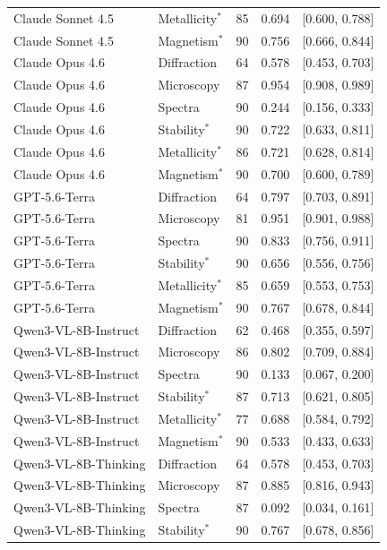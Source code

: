 \documentclass[11pt,a4paper]{article}
\begin{document}
\begin{table}[htbp]
{\begin{tabular}{l l S[table-format=3.0] S[table-format=1.3] c}
Claude Sonnet 4.5 & Metallicity$^{*}$ & 85 & 0.694 & [0.600, 0.788] \\
Claude Sonnet 4.5 & Magnetism$^{*}$ & 90 & 0.756 & [0.666, 0.844] \\
\addlinespace
Claude Opus 4.6 & Diffraction & 64 & 0.578 & [0.453, 0.703] \\
Claude Opus 4.6 & Microscopy & 87 & 0.954 & [0.908, 0.989] \\
Claude Opus 4.6 & Spectra & 90 & 0.244 & [0.156, 0.333] \\
Claude Opus 4.6 & Stability$^{*}$ & 90 & 0.722 & [0.633, 0.811] \\
Claude Opus 4.6 & Metallicity$^{*}$ & 86 & 0.721 & [0.628, 0.814] \\
Claude Opus 4.6 & Magnetism$^{*}$ & 90 & 0.700 & [0.600, 0.789] \\
\addlinespace
GPT-5.6-Terra & Diffraction & 64 & 0.797 & [0.703, 0.891] \\
GPT-5.6-Terra & Microscopy & 81 & 0.951 & [0.901, 0.988] \\
GPT-5.6-Terra & Spectra & 90 & 0.833 & [0.756, 0.911] \\
GPT-5.6-Terra & Stability$^{*}$ & 90 & 0.656 & [0.556, 0.756] \\
GPT-5.6-Terra & Metallicity$^{*}$ & 85 & 0.659 & [0.553, 0.753] \\
GPT-5.6-Terra & Magnetism$^{*}$ & 90 & 0.767 & [0.678, 0.844] \\
\addlinespace
Qwen3-VL-8B-Instruct & Diffraction & 62 & 0.468 & [0.355, 0.597] \\
Qwen3-VL-8B-Instruct & Microscopy & 86 & 0.802 & [0.709, 0.884] \\
Qwen3-VL-8B-Instruct & Spectra & 90 & 0.133 & [0.067, 0.200] \\
Qwen3-VL-8B-Instruct & Stability$^{*}$ & 87 & 0.713 & [0.621, 0.805] \\
Qwen3-VL-8B-Instruct & Metallicity$^{*}$ & 77 & 0.688 & [0.584, 0.792] \\
Qwen3-VL-8B-Instruct & Magnetism$^{*}$ & 90 & 0.533 & [0.433, 0.633] \\
\addlinespace
Qwen3-VL-8B-Thinking & Diffraction & 64 & 0.578 & [0.453, 0.703] \\
Qwen3-VL-8B-Thinking & Microscopy & 87 & 0.885 & [0.816, 0.943] \\
Qwen3-VL-8B-Thinking & Spectra & 87 & 0.092 & [0.034, 0.161] \\
Qwen3-VL-8B-Thinking & Stability$^{*}$ & 90 & 0.767 & [0.678, 0.856] \\

\end{tabular}}
\end{table}
\end{document}
